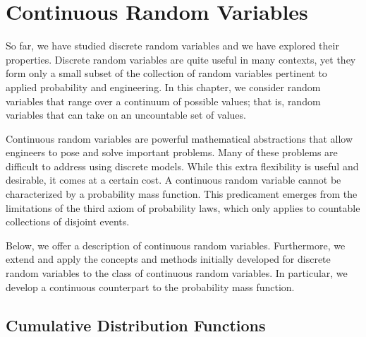 \chapter{Continuous Random Variables}

So far, we have studied discrete random variables and we have explored their properties.
Discrete random variables are quite useful in many contexts, yet they form only a small subset of the collection of random variables pertinent to applied probability and engineering.
In this chapter, we consider random variables that range over a continuum of possible values; that is, random variables that can take on an uncountable set of values.

Continuous random variables are powerful mathematical abstractions that allow engineers to pose and solve important problems.
Many of these problems are difficult to address using discrete models.
While this extra flexibility is useful and desirable, it comes at a certain cost.
A continuous random variable cannot be characterized by a probability mass function.
This predicament emerges from the limitations of the third axiom of probability laws, which only applies to countable collections of disjoint events.

Below, we offer a description of continuous random variables.
Furthermore, we extend and apply the concepts and methods initially developed for discrete random variables to the class of continuous random variables.
In particular, we develop a continuous counterpart to the probability mass function.


\section{Cumulative Distribution Functions}

